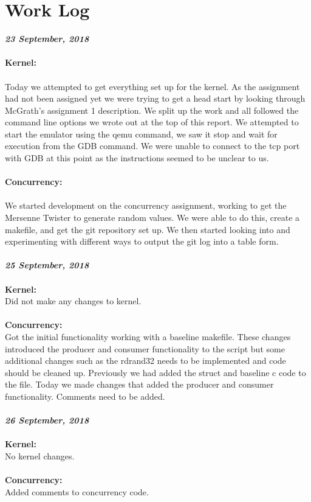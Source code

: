 \documentclass{article}
\begin{document}
\section{Work Log}

\textit{\textbf{23 September, 2018}} \\\\
\textbf{Kernel:} \\\\
\indent Today we attempted to get everything set up for the kernel. As the assignment had not been assigned yet we were trying to get a head start by looking through McGrath's assignment 1 description. We split up the work and all followed the command line options we wrote out at the top of this report. We attempted to start the emulator using the qemu command, we saw it stop and wait for execution from the GDB command. We were unable to connect to the tcp port with GDB at this point as the instructions seemed to be unclear to us.
\\\\
\textbf{Concurrency:} \\\\
\indent We started development on the concurrency assignment, working to get the Mersenne Twister to generate random values. We were able to do this, create a makefile, and get the git repository set up. We then started looking into and experimenting with different ways to output the git log into a table form.
\\\\

\noindent
\textit{\textbf{25 September, 2018}} \\\\
\textbf{Kernel:} \\
\indent Did not make any changes to kernel.
\\\\
\textbf{Concurrency:} \\
\indent Got the initial functionality working with a baseline makefile. These changes introduced the producer and consumer functionality to the script but some additional changes such as the rdrand32 needs to be implemented and code should be cleaned up. Previously we had added the struct and baseline c code to the file. Today we made changes that added the producer and consumer functionality. Comments need to be added.
\\\\

\noindent
\textit{\textbf{26 September, 2018}} \\\\
\textbf{Kernel:} \\
\indent No kernel changes.
\\\\
\textbf{Concurrency:} \\
\indent Added comments to concurrency code.
\\\\
\end{document}
